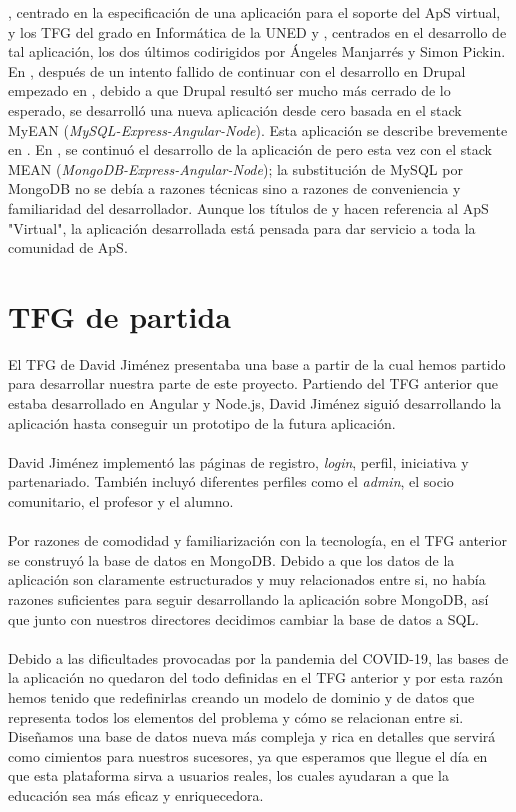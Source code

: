 \documentclass[11pt]{book}
\begin{document}
\cite{ref3}, centrado en la especificación de una aplicación para el soporte del
ApS virtual, y los TFG del grado en Informática de la UNED \cite{ref4} y \cite{ref5},
centrados en el desarrollo de tal aplicación, los dos últimos
codirigidos por Ángeles Manjarrés y Simon Pickin. En \cite{ref4}, después de un
intento fallido de continuar con el desarrollo en Drupal empezado en
\cite{ref3}, debido a que Drupal resultó ser mucho más cerrado de lo esperado,
se desarrolló una nueva aplicación desde cero basada en el stack MyEAN
(\emph{MySQL-Express-Angular-Node}). Esta aplicación se describe brevemente en
\cite{ref6}. En \cite{ref5}, se continuó el desarrollo de la aplicación de \cite{ref4} pero esta
vez con el stack MEAN (\emph{MongoDB-Express-Angular-Node}); la substitución de
MySQL por MongoDB no se debía a razones técnicas sino a razones de
conveniencia y familiaridad del desarrollador. Aunque los títulos de \cite{ref4}
y \cite{ref5} hacen referencia al ApS "Virtual", la aplicación desarrollada está
pensada para dar servicio a toda la comunidad de ApS.


\section{TFG de partida}
El TFG de David Jiménez presentaba una base a partir de la cual hemos partido para desarrollar nuestra parte de este proyecto. Partiendo del TFG anterior que estaba desarrollado en Angular y Node.js, David Jiménez siguió desarrollando la aplicación hasta conseguir un prototipo de la futura aplicación.\\\\
David Jiménez implementó las páginas de registro, \textit{login}, perfil, iniciativa y partenariado. También incluyó diferentes perfiles como el \textit{admin}, el socio comunitario, el profesor y el alumno.\\\\
 Por razones de comodidad y familiarización con la tecnología, en el TFG anterior se construyó la base de datos en MongoDB. Debido a que los datos de la aplicación son claramente estructurados y muy relacionados entre si, no había razones suficientes para seguir desarrollando la aplicación sobre MongoDB, así que junto con nuestros directores decidimos cambiar la base de datos a SQL.\\\\
Debido a las dificultades provocadas por la pandemia del COVID-19, las bases de la aplicación no quedaron del todo definidas en el TFG anterior y por esta razón hemos tenido que redefinirlas creando un modelo de dominio y de datos que representa todos los elementos del problema y cómo se relacionan entre si. Diseñamos una base de datos nueva más compleja y rica en detalles que servirá como cimientos para nuestros sucesores, ya que esperamos que llegue el día en que esta plataforma sirva a usuarios reales, los cuales ayudaran a que la educación sea más eficaz y enriquecedora.
 
\end{document}
